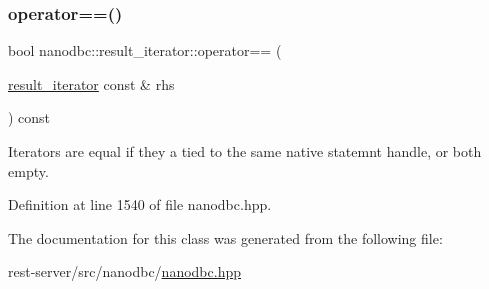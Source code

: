 \mbox{\label{classnanodbc_1_1result__iterator_a8db639b2b70997cb2e7c79368cb0f994}} 
\subsubsection{\texorpdfstring{operator==()}{operator==()}}
{\footnotesize\ttfamily bool nanodbc\+::result\+\_\+iterator\+::operator== (\begin{DoxyParamCaption}\item[{\mbox{\hyperlink{classnanodbc_1_1result__iterator}{result\+\_\+iterator}} const \&}]{rhs }\end{DoxyParamCaption}) const\hspace{0.3cm}{\ttfamily [inline]}}



Iterators are equal if they a tied to the same native statemnt handle, or both empty. 



Definition at line 1540 of file nanodbc.\+hpp.



The documentation for this class was generated from the following file\+:\begin{DoxyCompactItemize}
\item 
rest-\/server/src/nanodbc/\mbox{\hyperlink{nanodbc_8hpp}{nanodbc.\+hpp}}\end{DoxyCompactItemize}
